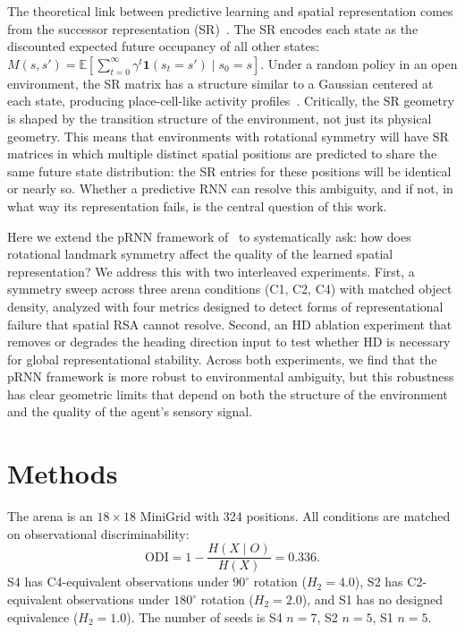 \documentclass[11pt, a4paper]{article}
\begin{document}
The theoretical link between predictive learning and spatial representation
comes from the successor representation (SR)~\citep{stachenfeld2017}. The
SR encodes each state as the discounted expected future occupancy of all
other states: $M(s,s') = \mathbb{E}\left[\sum_{t=0}^{\infty} \gamma^t
\mathbf{1}(s_t = s') \mid s_0 = s\right]$. Under a random policy in an
open environment, the SR matrix has a structure similar to a Gaussian
centered at each state, producing place-cell-like activity
profiles~\citep{stachenfeld2017}. Critically, the SR geometry is shaped
by the transition structure of the environment, not just its physical
geometry. This means that environments with rotational symmetry will have
SR matrices in which multiple distinct spatial positions are predicted to
share the same future state distribution: the SR entries for these
positions will be identical or nearly so. Whether a predictive RNN can
resolve this ambiguity, and if not, in what way its representation fails,
is the central question of this work.

Here we extend the pRNN framework of~\citet{levenstein2024} to
systematically ask: how does rotational landmark symmetry affect the
quality of the learned spatial representation? We address
this with two interleaved experiments. First, a symmetry sweep across
three arena conditions (C1, C2, C4) with matched object density, analyzed
with four metrics designed to detect forms of representational failure that
spatial RSA cannot resolve. Second, an HD ablation experiment that removes
or degrades the heading direction input to test whether HD is necessary for
global representational stability. Across both experiments, we find that the pRNN framework is more robust to environmental ambiguity, but this robustness has clear geometric limits that depend on both the structure of the environment and the quality of the agent's sensory signal.



\section*{Methods}

The arena is an $18 \times 18$ MiniGrid with 324 positions. All conditions are matched on observational discriminability:
\[
\mathrm{ODI}=1-\frac{H(X\mid O)}{H(X)}=0.336.
\]
S4 has C4-equivalent observations under $90^{\circ}$ rotation ($H_2=4.0$), S2 has C2-equivalent observations under $180^{\circ}$ rotation ($H_2=2.0$), and S1 has no designed equivalence ($H_2=1.0$). The number of seeds is S4 $n=7$, S2 $n=5$, S1 $n=5$.
\end{document}
